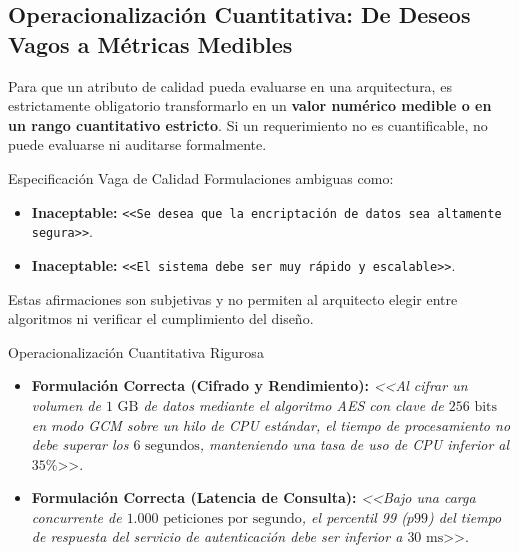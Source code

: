 \subsection{Operacionalización Cuantitativa: De Deseos Vagos a Métricas Medibles}

Para que un atributo de calidad pueda evaluarse en una arquitectura, es estrictamente obligatorio transformarlo en un \textbf{valor numérico medible o en un rango cuantitativo estricto}. Si un requerimiento no es cuantificable, no puede evaluarse ni auditarse formalmente.

\begin{antipatron}{Especificación Vaga de Calidad}
Formulaciones ambiguas como:
\begin{itemize}
  \item \textcolor{alertred}{\textbf{Inaceptable:}} \texttt{<<Se desea que la encriptación de datos sea altamente segura>>}.
  \item \textcolor{alertred}{\textbf{Inaceptable:}} \texttt{<<El sistema debe ser muy rápido y escalable>>}.
\end{itemize}
Estas afirmaciones son subjetivas y no permiten al arquitecto elegir entre algoritmos ni verificar el cumplimiento del diseño.
\end{antipatron}

\begin{ejemplo}{Operacionalización Cuantitativa Rigurosa}
\begin{itemize}
  \item \textcolor{alertgreen}{\textbf{Formulación Correcta (Cifrado y Rendimiento):}} \emph{<<Al cifrar un volumen de $1\text{ GB}$ de datos mediante el algoritmo AES con clave de $256\text{ bits}$ en modo GCM sobre un hilo de CPU estándar, el tiempo de procesamiento no debe superar los $6\text{ segundos}$, manteniendo una tasa de uso de CPU inferior al $35\%$}>>.
  \item \textcolor{alertgreen}{\textbf{Formulación Correcta (Latencia de Consulta):}} \emph{<<Bajo una carga concurrente de $1.000\text{ peticiones por segundo}$, el percentil 99 ($p99$) del tiempo de respuesta del servicio de autenticación debe ser inferior a $30\text{ ms}$}>>.
\end{itemize}
\end{ejemplo}

